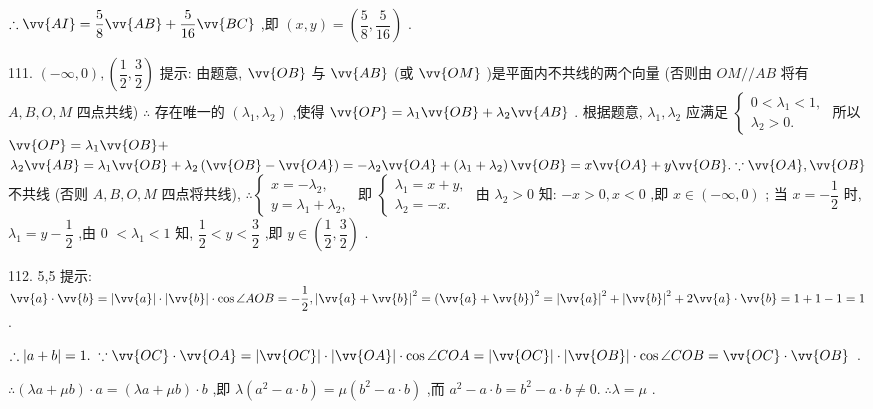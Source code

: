 $\therefore \vv{AI} = \dfrac{5}{8}\vv{AB} + \dfrac{5}{16}\vv{BC}$ ,即 $\left( {x,y}\right)  = \left( {\dfrac{5}{8},\dfrac{5}{16}}\right)$ .

111. $\left( {-\infty ,0}\right) ,\left( {\dfrac{1}{2},\dfrac{3}{2}}\right)$ 提示: 由题意, $\vv{OB}$ 与 $\vv{AB}$ (或 $\vv{OM}$ )是平面内不共线的两个向量 (否则由 ${OM}//{AB}$ 将有 $A,B,O,M$ 四点共线) $\therefore$ 存在唯一的 $\left( {{\lambda }_{1},{\lambda }_{2}}\right)$ ,使得 $\vv{OP} = {\lambda }_{1}\vv{OB} + {\lambda }_{2}\vv{AB}$ . 根据题意, ${\lambda }_{1},{\lambda }_{2}$ 应满足 $\left\{  \begin{array}{l} 0 < {\lambda }_{1} < 1, \\  {\lambda }_{2} > 0. \end{array}\right.$ 所以 $\vv{OP} = {\lambda }_{1}\vv{OB} +$  ${\lambda }_{2}\vv{AB} = {\lambda }_{1}\vv{OB} + {\lambda }_{2}\left( {\vv{OB} - \vv{OA}}\right)  =  - {\lambda }_{2}\vv{OA} + \left( {{\lambda }_{1} + {\lambda }_{2}}\right) \vv{OB} = x\vv{OA} + y\vv{OB}.\because \vv{OA},\vv{OB}$ 不共线 (否则 $A,B,O,M$ 四点将共线), $\therefore \left\{  \begin{array}{l} x =  - {\lambda }_{2}, \\  y = {\lambda }_{1} + {\lambda }_{2}, \end{array}\right.$ 即 $\left\{  \begin{array}{l} {\lambda }_{1} = x + y, \\  {\lambda }_{2} =  - x. \end{array}\right.$ 由 ${\lambda }_{2} > 0$ 知: $- x > 0,x < 0$ ,即 $x \in  \left( {-\infty ,0}\right)$ ; 当 $x =  - \dfrac{1}{2}$ 时, ${\lambda }_{1} = y - \dfrac{1}{2}$ ,由 0 $< {\lambda }_{1} < 1$ 知, $\dfrac{1}{2} < y < \dfrac{3}{2}$ ,即 $y \in  \left( {\dfrac{1}{2},\dfrac{3}{2}}\right)$ .

112. 5,5 提示: $\vv{a} \cdot  \vv{b} = \left| \vv{a}\right|  \cdot  \left| \vv{b}\right|  \cdot  \cos \angle {AOB} =  - \dfrac{1}{2},{\left| \vv{a} + \vv{b}\right| }^{2} = {\left( \vv{a} + \vv{b}\right) }^{2} = {\left| \vv{a}\right| }^{2} + {\left| \vv{b}\right| }^{2} + 2\vv{a} \cdot  \vv{b} = 1 + 1 - 1 = 1$ .

$\therefore \left| {a + b}\right|  = 1.\;\because \vv{OC} \cdot  \vv{OA} = \left| \vv{OC}\right|  \cdot  \left| \vv{OA}\right|  \cdot  \cos \angle {COA} = \left| \vv{OC}\right|  \cdot  \left| \vv{OB}\right|  \cdot  \cos \angle {COB} = \vv{OC} \cdot  \vv{OB}$ .

$\therefore \left( {{\lambda a} + {\mu b}}\right)  \cdot  a = \left( {{\lambda a} + {\mu b}}\right)  \cdot  b$ ,即 $\lambda \left( {{a}^{2} - a \cdot  b}\right)  = \mu \left( {{b}^{2} - a \cdot  b}\right)$ ,而 ${a}^{2} - a \cdot  b = {b}^{2} - a \cdot  b \neq  0.\;\therefore \lambda  = \mu$ .

